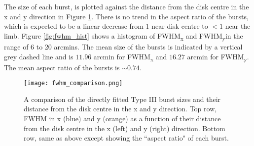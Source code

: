 

The size of each burst, is plotted against the distance from the disk centre in the x and y direction in Figure \ref{fig:fwhm_comp}. 
There is no trend in the aspect ratio of the bursts, which is expected to be a linear decrease from 1 near disk centre to $< 1$ near the limb. Figure \ref{fig:fwhm_hist} shows a histogram of FWHM\textsubscript{x} and FWHM\textsubscript{y}in the range of 6 to 20 arcmins. The mean size of the bursts is indicated by a vertical grey dashed line and is $11.96$ arcmin for FWHM\textsubscript{x} and $16.27$ arcmin for FWHM\textsubscript{y}. The mean aspect ratio of the bursts is $\sim 0.74$.

\begin{figure}[ht]
\centering
\texttt{[image: fwhm\_comparison.png]}
\caption[Directly fitted Type III burst sizes as a function of position relative to disk centre.]{A comparison of the directly fitted Type III burst sizes and their distance from the disk centre in the x and y direction. Top row, FWHM in x (blue) and y (orange) as a function of their distance from the disk centre in the x (left) and y (right) direction. Bottom row, same as above except showing the ``aspect ratio" of each burst.}
\label{fig:fwhm_comp}
\end{figure}

